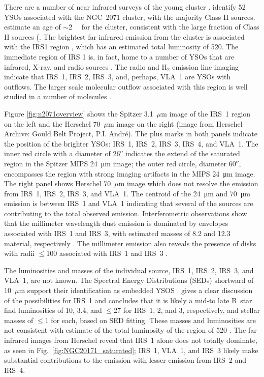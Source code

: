 There are a number of near infrared surveys of the young cluster \citep[e.g.,][]{Strom1976,Lada1991,Megeath2012,Spezzi2015}. \cite{Spezzi2015} identify 52 YSOs associated with the NGC~2071 cluster, with the majority Class II sources. \cite{Flaherty2008} estimate an age of $\sim$\SI{2}{\mega\year} for the cluster, consistent with the large fraction of Class II sources (\cite{Evans2009}. The brightest far infrared emission from the cluster is associated with the IRS1 region \citep{Harvey1979,Butner1990}, which has an estimated total luminosity of \SI{520}{\Lsun}. The immediate region of IRS 1 is, in fact, home to a number of YSOs that are infrared, X-ray, and radio sources \citep{Skinner2009,C-G2012,Kempen2012}. The radio \citep{C-G2012} and H$_2$ emission line imaging indicate that IRS~1, IRS~2, IRS~3, and, perhaps, VLA~1 are YSOs with outflows. The larger scale molecular outflow associated with this region is well studied in a number of molecules \citep{Bally1982,Chernin1993,Stoji2008}.

Figure \ref{fig:n2071overview} shows the Spitzer 3.1~$\mu$m image of the IRS~1 region on the left \citep[image from Spitzer Archive:][]{Megeath2012} and the Herschel 70~$\mu$m image on the right (image from Herschel Archive: Gould Belt Project, P.I. Andr\'e). The plus marks in both panels indicate the position of the brighter YSOs: IRS~1, IRS~2, IRS~3, IRS~4, and VLA~1. The inner red circle with a diameter of \ang{;;26} indicates the extend of the saturated region in the Spitzer MIPS \SI{24}{\um} image; the outer red circle, diameter \ang{;;60}, encompasses the region with strong imaging artifacts in the MIPS \SI{24}{\um} image.
The right panel shows Herschel 70~$\mu$m image which does not resolve the emission from IRS~1, IRS~2, IRS~3, and VLA~1. The centroid of the \SI{24}{\um} and \SI{70}{\um} emission is between IRS~1 and VLA~1 indicating that several of the sources are contributing to the total observed emission. Interferometric observations show that the millimeter wavelength dust emission is dominated by envelopes associated with IRS~1 and IRS~3, with estimated masses of 8.2 and \SI{12.3}{\Msun} material, respectively \citep{Kempen2012}. The millimeter emission also reveals the presence of disks with radii $\le$\SI{100}{\au} associated with IRS~1 and IRS~3 \citep{Kempen2012}.

The luminosities and masses of the individual source, IRS~1, IRS~2, IRS~3, and VLA~1, are not known. The Spectral Energy Distributions (SEDs) shortward of 10~$\mu$m support their identification as embedded YSOS \citep{Skinner2009}. \cite{Skinner2009} gives a clear discussion of the possibilities for IRS~1 and concludes that it is likely a mid-to late B~star. \cite{Kempen2012} find luminosities of 10, 3.4, and $\le$\SI{27}{\Lsun} for IRS~1, 2, and 3, respectively, and stellar masses of $\le$\SI{1}{\Msun} for each, based on SED fitting. These masses and luminosities are not consistent with estimate of the total luminosity of the region of \SI{520}{\Lsun} \citep{Butner1990}. The far infrared images from Herschel reveal that IRS~1 alone does not totally dominate, as seen in Fig.~\ref{fig:NGC20171_saturated}; IRS~1, VLA~1, and IRS~3 likely make substantial contributions to the emission with lesser emission from IRS~2 and IRS~4.

